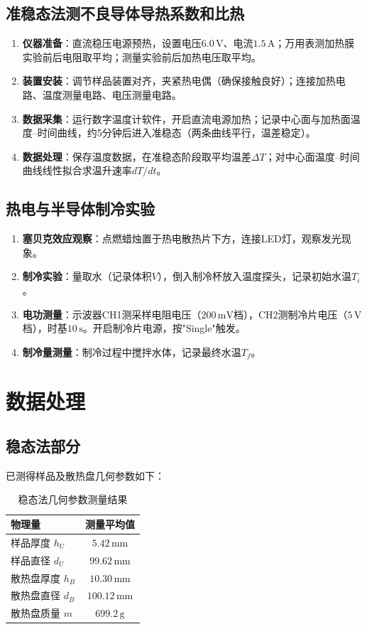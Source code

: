 \documentclass[UTF8]{article}
\begin{document}
\subsection{准稳态法测不良导体导热系数和比热}
\begin{enumerate}
    \item \textbf{仪器准备}：直流稳压电源预热，设置电压$6.0\,\mathrm{V}$、电流$1.5\,\mathrm{A}$；万用表测加热膜实验前后电阻取平均；测量实验前后加热电压取平均。
    \item \textbf{装置安装}：调节样品装置对齐，夹紧热电偶（确保接触良好）；连接加热电路、温度测量电路、电压测量电路。
    \item \textbf{数据采集}：运行数字温度计软件，开启直流电源加热；记录中心面与加热面温度--时间曲线，约5分钟后进入准稳态（两条曲线平行，温差稳定）。
    \item \textbf{数据处理}：保存温度数据，在准稳态阶段取平均温差$\Delta T$；对中心面温度--时间曲线线性拟合求温升速率$dT/dt$。
\end{enumerate}

\subsection{热电与半导体制冷实验}
\begin{enumerate}
    \item \textbf{塞贝克效应观察}：点燃蜡烛置于热电散热片下方，连接LED灯，观察发光现象。
    \item \textbf{制冷实验}：量取水（记录体积$V$），倒入制冷杯放入温度探头，记录初始水温$T_i$。
    \item \textbf{电功测量}：示波器CH1测采样电阻电压（$200\,\mathrm{mV}$档），CH2测制冷片电压（$5\,\mathrm{V}$档），时基$10\,\mathrm{s}$。开启制冷片电源，按"Single"触发。
    \item \textbf{制冷量测量}：制冷过程中搅拌水体，记录最终水温$T_f$。
\end{enumerate}

\section{数据处理}

\subsection{稳态法部分}

已测得样品及散热盘几何参数如下：

\begin{table}[h]
\centering
\caption{稳态法几何参数测量结果}
\label{tab:geo}
\begin{tabular}{lc}
\toprule
物理量 & 测量平均值 \\
\midrule
样品厚度 $h_U$ & $5.42\,\mathrm{mm}$ \\
样品直径 $d_U$ & $99.62\,\mathrm{mm}$ \\
散热盘厚度 $h_B$ & $10.30\,\mathrm{mm}$ \\
散热盘直径 $d_B$ & $100.12\,\mathrm{mm}$ \\
散热盘质量 $m$ & $699.2\,\mathrm{g}$ \\
\bottomrule
\end{tabular}
\end{table}
\end{document}
